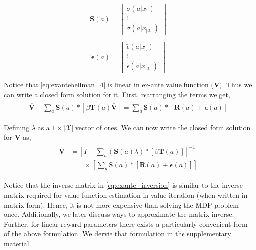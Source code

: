 \documentclass{article}
\begin{document}
\[
\mathbf{S}(a)=\left[\begin{array}{c}\sigma(a|x_1)\\ \vdots\\ \sigma(a|x_{|\mathcal{X}|})\end{array} \right]
\]

\[
\tilde{\bm{\epsilon}}(a)=\left[\begin{array}{c}\tilde{\epsilon}(a|x_1)\\ \vdots \\ \tilde{\epsilon}(a|x_{|\mathcal{X}|})\end{array}\right]
\]



Notice that \eqref{eq:exantebellman_4} is linear in ex-ante value function ($\overline{\mathbf{V}}$). Thus we can write a closed form solution for it.
First, rearranging the terms we get,
\begin{align}
    \begin{split}
    \overline{\mathbf{V}}-\sum_{a}\mathbf{S}(a) *\left[ \beta \mathbf{T}(a) \overline{\mathbf{V}}\right]=\sum_{a}\mathbf{S}(a) *\left[ \mathbf{R}(a)+\tilde{\bm{\epsilon}}(a)\right]
    \end{split}
\end{align}

Defining $\lambda$ as a $1\times|\mathcal{X}|$ vector of ones.
We can now write the closed form solution for $\overline{\mathbf{V}}$ as,
\begin{align} \label{eq:exante_inversion}
\begin{split}
\overline{\mathbf{V}} &=\left[I-\sum_{a}(\mathbf{S}(a) \lambda) *\left[ \beta \mathbf{T}(a)  \right]\right]^{-1} \\
& \qquad \times \left[\sum_{a}\mathbf{S}(a) *\left[ \mathbf{R}(a)+\tilde{\bm{\epsilon}}(a)\right]\right]
\end{split}
\end{align}

Notice that the inverse matrix in \eqref{eq:exante_inversion} is similar to the inverse matrix required for value function estimation in value iteration (when written in matrix form). Hence, it is not more expensive than solving the MDP problem once. Additionally, we later discuss ways to approximate the matrix inverse.
Further, for linear reward parameters there exists a particularly convenient form of the above formulation. We dervie that formulation in the supplementary material.
\end{document}

